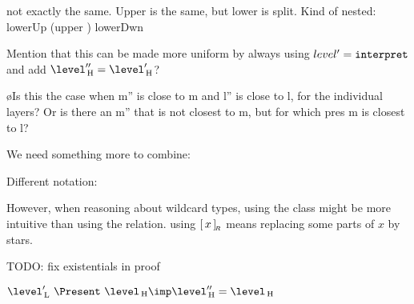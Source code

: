 

not exactly the same. Upper is the same, but lower is split. Kind of nested: lowerUp (upper ) lowerDwn

Mention that this can be made more uniform by always using $level' = {\tt interpret}$ and add $\level''\H = \level'\H$?

\bl
\o Is this the case when m'' is close to m and l'' is close to l, for the individual layers? Or is there an m'' that is not closest to m, but for which pres m is closest to l?
\el

We need something more to combine:



Different notation:

However, when reasoning about wildcard types, using the class might be more intuitive than using the relation. using $[\,{x}\,]_{{\!_{R}}}$ means replacing some parts of $x$ by stars.






TODO: fix existentials in proof

$\level'\L ~\Present~\level\H \imp \level''\H = \level\H$\\

